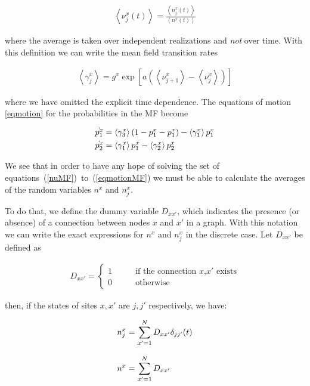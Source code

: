 \begin{align}
    \left< \nu^x_j(t) \right> = \frac{\left< n^x_j(t) \right>}{\left< n^x(t) \right>}
    \label{nuMF}
\end{align}

\noindent where the average is taken over independent realizations and \textit{not} over time. With this definition we can write the
mean field transition rates

\begin{align}
    \left< \gamma^x_j \right> = g^x \exp \left[ a \left( \left< \nu^x_{j+1} \right> - \left< \nu^x_j \right> \right) \right]
    \label{gammaMF}
\end{align}

\noindent where we have omitted the explicit time dependence. The equations of motion \ref{eqmotion} for the probabilities in the MF
become

\begin{align}
    \dot{p^x_1} &= \left< \gamma^x_3 \right> (1-p^x_1-p^x_1) - \left< \gamma^x_1 \right> p^x_1 \notag \\
    \dot{p^x_2} &= \left< \gamma^x_1 \right>  p^x_1 - \left< \gamma^x_2 \right> p^x_2
    \label{eqmotionMF}
\end{align}

We see that in order to have any hope of solving the set of equations~(\ref{nuMF})~to~(\ref{eqmotionMF}) we must be able to calculate
the averages of the random variables $n^x$ and $n^x_j$.

To do that, we define the dummy variable $D_{xx'}$, which indicates the presence (or absence) of a connection between nodes $x$ and
$x'$ in a graph. With this notation we can write the exact expressions for $n^x$ and $n^x_j$ in the discrete case. Let $D_{xx'}$ be
defined as

\begin{align}
    D_{xx'} = 
    \begin{cases}
        1 \qquad &\text{if the connection $x$,$x'$ exists}\\
        0 \qquad &\text{otherwise}
    \end{cases}
\end{align}

\noindent then, if the states of sites $x,x'$ are $j,j'$ respectively, we have:

\begin{align}
    n^x_j &= \sum\limits_{x'=1}^ND_{xx'}\delta_{jj'}(t) \notag\\[8pt]
    n^x &= \sum\limits_{x'=1}^ND_{xx'}
\end{align}

